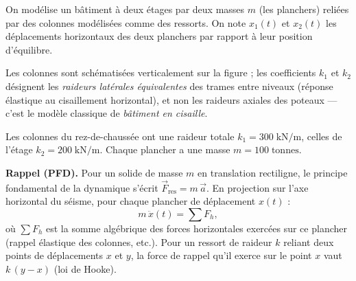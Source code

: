 \begin{enumerate}[itemsep=2em]
\begin{center}
\end{center}

\medskip

On modélise un bâtiment à deux étages par deux masses $m$ (les planchers) reliées par des colonnes modélisées comme des ressorts. On note $x_1(t)$ et $x_2(t)$ les déplacements horizontaux des deux planchers par rapport à leur position d'équilibre.

Les colonnes sont schématisées verticalement sur la figure ; les coefficients $k_1$ et $k_2$ désignent les \emph{raideurs latérales équivalentes} des trames entre niveaux (réponse élastique au cisaillement horizontal), et non les raideurs axiales des poteaux --- c'est le modèle classique de \emph{bâtiment en cisaille}.

Les colonnes du rez-de-chaussée ont une raideur totale $k_1 = 300\;\mathrm{kN/m}$, celles de l'étage $k_2 = 200\;\mathrm{kN/m}$. Chaque plancher a une masse $m = 100\;\mathrm{tonnes}$.

\medskip
\noindent\textbf{Rappel (PFD).}
Pour un solide de masse $m$ en translation rectiligne, le principe fondamental de la dynamique s'écrit $\vec{F}_{\mathrm{res}} = m\,\vec{a}$. En projection sur l'axe horizontal du séisme, pour chaque plancher de déplacement $x(t)$ :
\[
  m\,\ddot{x}(t) = \sum F_h,
\]
où $\sum F_h$ est la somme algébrique des forces horizontales exercées sur ce plancher (rappel élastique des colonnes, etc.). Pour un ressort de raideur $k$ reliant deux points de déplacements $x$ et $y$, la force de rappel qu'il exerce sur le point $x$ vaut $k\,(y-x)$ (loi de Hooke).


\end{enumerate}
